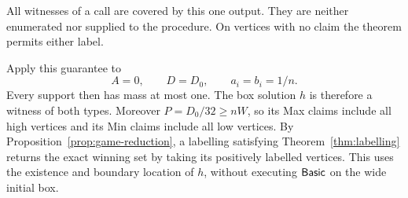 All witnesses of a call are covered by this one output. They are
neither enumerated nor supplied to the procedure. On vertices with
no claim the theorem permits either label.

Apply this guarantee to
\begin{equation}
                  A=0,\qquad D=D_0,\qquad a_i=b_i=1/n.
 \label{eq:main-call}
\end{equation}
Every support then has mass at most one. The box solution $h$ is
therefore a witness of both types. Moreover
$P=D_0/32\ge nW$, so its Max claims include all high vertices and
its Min claims include all low vertices. By
Proposition~\ref{prop:game-reduction}, a labelling satisfying
Theorem~\ref{thm:labelling} returns the exact winning set by taking
its positively labelled vertices. This uses the existence and
boundary location of $h$, without executing $\mathsf{Basic}$ on the wide
initial box.
